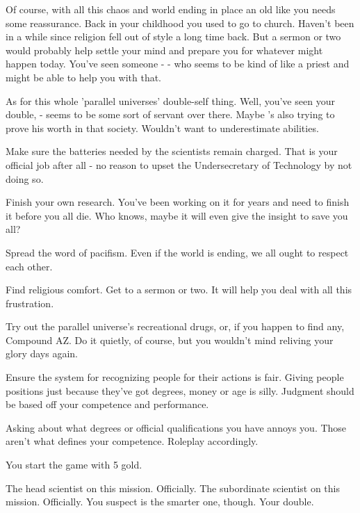 \documentclass[char]{guildcamp3}
\begin{document}
Of course, with all this chaos and world ending in place an old \cTech{\human} like you needs some reassurance. Back in your childhood you used to go to church. Haven't been in a while since religion fell out of style a long time back. But a sermon or two would probably help settle your mind and prepare you for whatever might happen today. You've seen someone - \cPaladin{\intro} - who seems to be kind of like a priest and might be able to help you with that. 

As for this whole 'parallel universes' double-self thing. Well, you've seen your double, \cServant{\intro} - seems to be some sort of servant over there. Maybe \cServant{\they}'s also trying to prove his worth in that society. Wouldn't want to underestimate \cServant{\their} abilities.


\begin{itemz}[Goals]
  \item Make sure the batteries needed by the scientists remain charged. That is your official job after all - no reason to upset the Undersecretary of Technology by not doing so. 
  \item Finish your own research. You've been working on it for years and need to finish it before you all die. Who knows, maybe it will even give the insight to save you all?
  \item Spread the word of pacifism. Even if the world is ending, we all ought to respect each other.
  \item Find religious comfort. Get to a sermon or two. It will help you deal with all this frustration.
  \item Try out the parallel universe's recreational drugs, or, if you happen to find any, Compound AZ. Do it quietly, of course, but you wouldn't mind reliving your glory days again.
  \item Ensure the system for recognizing people for their actions is fair. Giving people positions just because they've got degrees, money or age is silly. Judgment should be based off your competence and performance. 
\end{itemz}

\begin{itemz}[Notes]
  \item Asking about what degrees or official qualifications you have annoys you. Those aren't what defines your competence. Roleplay accordingly.  
  \item You start the game with 5 gold. 
\end{itemz}


\begin{contacts}
  \contact{\cSciOne{}} The head scientist on this mission. Officially. 
  \contact{\cSciTwo{}} The subordinate scientist on this mission. Officially. You suspect \cSciTwo{} is the smarter one, though.
  \contact{\cServant{}} Your double. 
\end{contacts}
\end{document}
